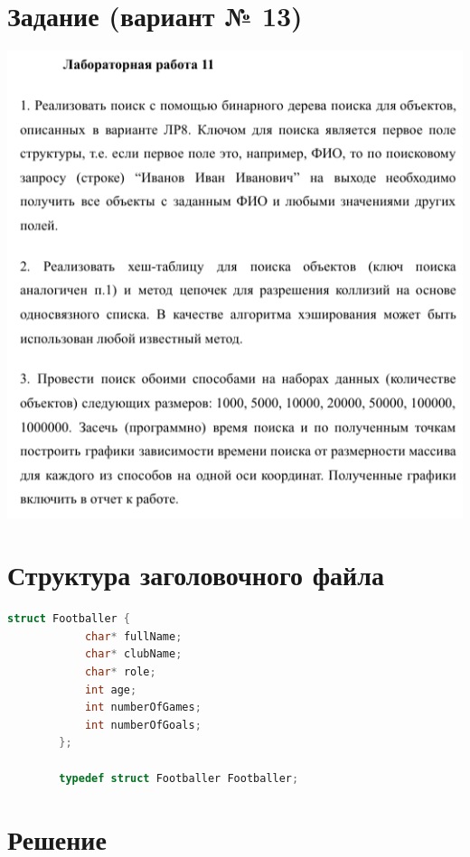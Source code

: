 \documentclass[12pt]{article}
\begin{document}
	\newpage
	
	
	\section{Задание (вариант № 13)}
	
	
	\includegraphics[width=\linewidth]{images/task}

	
	\newpage
	
	\section{Структура заголовочного файла}
	
	\begin{lstlisting}[language=C]
		struct Footballer {
			char* fullName;
			char* clubName;
			char* role;
			int age;
			int numberOfGames;
			int numberOfGoals;
		};
		
		typedef struct Footballer Footballer;
	\end{lstlisting}
	
	\section{Решение}
	
\end{document}
